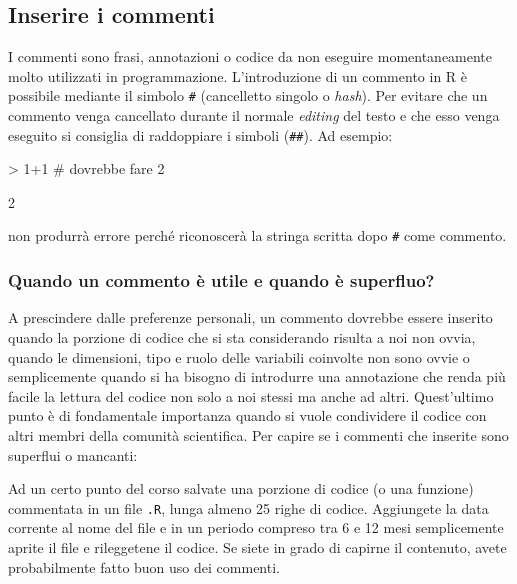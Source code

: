 \documentclass[onecolumn,11pt]{book}
\begin{document}
\subsection*{Inserire i commenti}
I commenti sono frasi, annotazioni o codice da non eseguire momentaneamente molto utilizzati in programmazione. L'introduzione di un commento in \textsf{R} \`e possibile mediante il simbolo \texttt{\#} (cancelletto singolo o \emph{hash}). Per evitare che un commento venga cancellato durante il normale \textit{editing} del testo e che esso venga eseguito si consiglia di raddoppiare i simboli (\texttt{\#\#}). Ad esempio:
\index{\texttt{\#}}
\begin{Schunk}
\begin{Sinput}
> 1+1 # dovrebbe fare 2
\end{Sinput}
\begin{Soutput}
[1] 2
\end{Soutput}
\end{Schunk}
non produrr\`a errore perch\'e riconoscer\`a la stringa scritta dopo \texttt{\#} come commento.

\subsubsection{Quando un commento \`e utile e quando \`e superfluo?}
A prescindere dalle preferenze personali, un commento dovrebbe essere inserito quando la porzione di codice che si sta considerando risulta a noi non ovvia, quando le dimensioni, tipo e ruolo delle variabili coinvolte non sono ovvie o semplicemente quando si ha bisogno di introdurre una annotazione che renda pi\`u facile la lettura del codice non solo a noi stessi ma anche ad altri. Quest'ultimo punto \`e di fondamentale importanza quando si vuole condividere il codice con altri membri della comunit\`a scientifica. Per capire se i commenti che inserite sono superflui o mancanti:
\begin{shaded}
Ad un certo punto del corso salvate una porzione di codice (o una funzione) commentata in un file \texttt{.R}, lunga almeno 25 righe di codice. Aggiungete la data corrente al nome del file e in un periodo compreso tra 6 e 12 mesi semplicemente aprite il file e rileggetene il codice. Se siete in grado di capirne il contenuto, avete probabilmente fatto buon uso dei commenti.
 \end{shaded}
\end{document}
